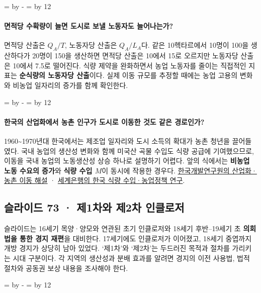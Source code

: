 \documentclass[10pt,a4paper]{article}
\newcommand{\ReserveQuestionSpace}{%
  \par\begingroup
  \dimen0=\pagegoal \advance\dimen0 by -\pagetotal
  \dimen2=\baselineskip \multiply\dimen2 by 12
  \ifdim\dimen0<\dimen2 \newpage\fi
  \endgroup}
\begin{document}
\ReserveQuestionSpace
\paragraph{면적당 수확량이 늘면 도시로 보낼 노동자도 늘어나는가?}
면적당 산출은 $Q_A/T$, 노동자당 산출은 $Q_A/L_A$다. 같은 10헥타르에서 10명이 100을 생산하다가 20명이 150을 생산하면 면적당 산출은 10에서 15로 오르지만 노동자당 산출은 10에서 7.5로 떨어진다. 식량 제약을 완화하면서 농업 노동자를 줄이는 직접적인 지표는 \textbf{순식량의 노동자당 산출}이다. 실제 이동 규모를 추정할 때에는 농업 고용의 변화와 비농업 일자리의 증가를 함께 확인한다.\par

\ReserveQuestionSpace
\paragraph{한국의 산업화에서 농촌 인구가 도시로 이동한 것도 같은 경로인가?}
1960\textasciitilde{}1970년대 한국에서는 제조업 일자리와 도시 소득의 확대가 농촌 청년을 끌어들였다. 국내 농업의 생산성 변화와 함께 미국산 곡물 수입도 식량 공급에 기여했으므로, 이동을 국내 농업의 노동생산성 상승 하나로 설명하기 어렵다. 앞의 식에서는 \textbf{비농업 노동 수요의 증가}와 \textbf{식량 수입 $M$}이 동시에 작용한 경우다. \href{https://eiec.kdi.re.kr/publish/naraView.do?cidx=11455\&fcode=00002000040000100012}{한국개발연구원의 산업화·농촌 이동 해설} · \href{https://documents1.worldbank.org/curated/en/542941468773719365/pdf/multi-page.pdf}{세계은행의 한국 식량 수입·농업정책 연구}.\par

\subsection{슬라이드 73 · 제1차와 제2차 인클로저}
슬라이드는 16세기 목양·양모와 연관된 초기 인클로저와 18세기 후반–19세기 초 \textbf{의회법을 통한 경지 재편}을 대비한다. 17세기에도 인클로저가 이어졌고, 18세기 중엽까지 개방 경지가 상당히 남아 있었다. ‘제1차’와 ‘제2차’는 두드러진 목적과 절차를 가리키는 시대 구분이다. 각 지역의 생산성과 분배 효과를 알려면 경지의 이전 사용법, 법적 절차와 공동권 보상 내용을 조사해야 한다.\par

\ReserveQuestionSpace
\end{document}
